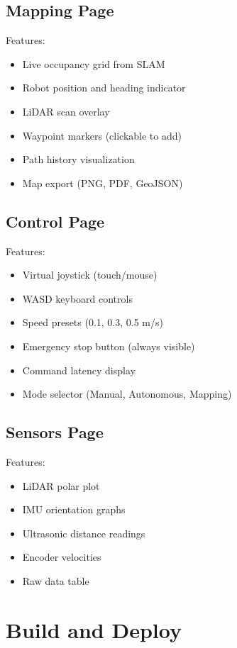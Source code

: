 \subsection{Mapping Page}

Features:
\begin{itemize}
    \item Live occupancy grid from SLAM
    \item Robot position and heading indicator
    \item LiDAR scan overlay
    \item Waypoint markers (clickable to add)
    \item Path history visualization
    \item Map export (PNG, PDF, GeoJSON)
\end{itemize}

\subsection{Control Page}

Features:
\begin{itemize}
    \item Virtual joystick (touch/mouse)
    \item WASD keyboard controls
    \item Speed presets (0.1, 0.3, 0.5 m/s)
    \item Emergency stop button (always visible)
    \item Command latency display
    \item Mode selector (Manual, Autonomous, Mapping)
\end{itemize}

\subsection{Sensors Page}

Features:
\begin{itemize}
    \item LiDAR polar plot
    \item IMU orientation graphs
    \item Ultrasonic distance readings
    \item Encoder velocities
    \item Raw data table
\end{itemize}

\section{Build and Deploy}

